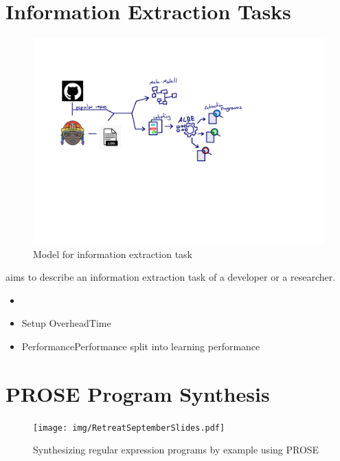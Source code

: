 \documentclass[\myrootdir/main.tex]{subfiles}
\begin{document}
\section{Information Extraction Tasks}
\begin{figure}[h]
	\centering
	\includegraphics[page=4, width=\textwidth, trim={0.5cm 0.5cm 0.5cm 0.5cm}, clip]{img/flow-of-research.pdf}
	\caption{Model for information extraction task}
	\label{fig:modelt-ie-task}
\end{figure}
aims to describe an information extraction task of a developer or a researcher.
\begin{itemize}
	\item {}
	\item{Setup Overhead}{Time}
	\item{Performance}{Performance} split into learning performance
\end{itemize}


\section{PROSE Program Synthesis}
\begin{figure}[h]
  \centering
\texttt{[image: img/RetreatSeptemberSlides.pdf]}
  \caption{Synthesizing regular expression programs by example using PROSE}
  \label{fig:prose-explanation}
\end{figure}
\end{document}
